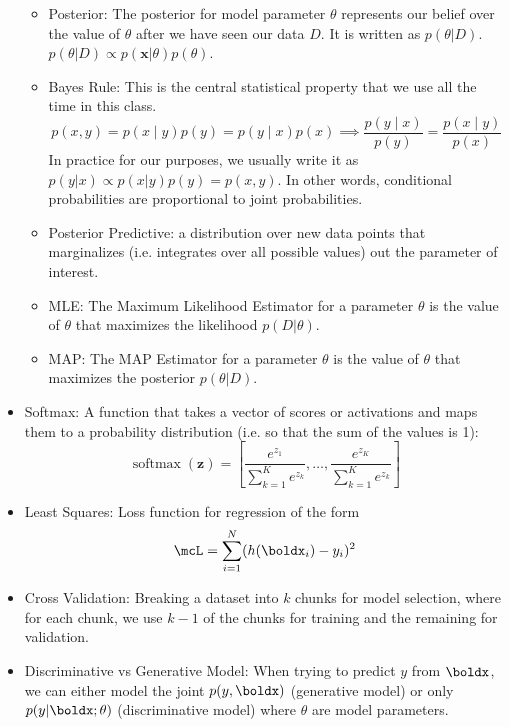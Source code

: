 \documentclass[12pt,letterpaper]{article}
\newcommand{\1}{\mathbbm{1}}
\newcommand{\on}{\operatorname}
\begin{document}
\begin{itemize}
\begin{itemize}
    \item Posterior: The posterior for model parameter $\theta$ represents our belief over the value of $\theta$ after we have seen our data $D$. It is written as $p(\theta|D)$.\\ $p(\theta|D) \propto p(\mathbf{x}|\theta)p(\theta)$.
    \item Bayes Rule: This is the central statistical property that we use all the time in this class. 
    $$p(x, y) = p(x \mid y)p(y) = p(y \mid x)p(x) \implies \frac{p(y \mid x)}{p(y)} = \frac{p(x \mid y)}{p(x)}$$
    In practice for our purposes, we usually write it as $p(y | x) \propto p(x | y)p(y) = p(x, y)$. In other words, conditional probabilities are proportional to joint probabilities.
    \item Posterior Predictive: a distribution over new data points that marginalizes (i.e. integrates over all possible values) out the parameter of interest. 
    \item MLE: The Maximum Likelihood Estimator for a parameter $\theta$ is the value of $\theta$ that maximizes the likelihood $p(D|\theta)$.
    \item MAP: The MAP Estimator for a parameter $\theta$ is the value of $\theta$ that maximizes the posterior $p(\theta|D)$.
    \end{itemize}
    \item Softmax: A function that takes a vector of scores or activations and maps them to a probability distribution (i.e. so that the sum of the values is 1):
    $$\on{softmax}(\mathbf{z}) = \left[\frac{e^{z_1}}{\sum_{k = 1}^K e^{z_k}}, \ldots, \frac{e^{z_K}}{\sum_{k = 1}^K e^{z_k}}\right]$$
    \item Least Squares: Loss function for regression of the form 
    $$\mcL = \sum_{i=1}^N (h(\boldx_i) - y_i)^2$$
    \item Cross Validation: Breaking a dataset into $k$ chunks for model selection, where for each chunk, we use $k-1$ of the chunks for training and the remaining for validation.
    \item Discriminative vs Generative Model: When trying to predict $y$ from $\boldx$, we can either model the joint $p(y, \boldx)$ (generative model) or only $p(y | \boldx; \theta)$ (discriminative model) where $\theta$ are model parameters.
    
\end{itemize}
\end{document}
